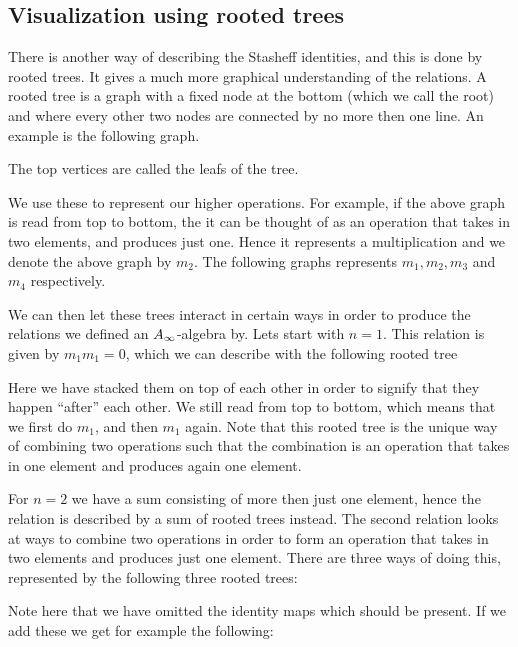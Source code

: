 
\subsection{Visualization using rooted trees}

There is another way of describing the Stasheff identities, and this is done by rooted trees. It gives a much more graphical understanding of the relations. A rooted tree is a graph with a fixed node at the bottom (which we call the root) and where every other two nodes are connected by no more then one line. An example is the following graph.



The top vertices are called the leafs of the tree. 

We use these to represent our higher operations. For example, if the above graph is read from top to bottom, the it can be thought of as an operation that takes in two elements, and produces just one. Hence it represents a multiplication and we denote the above graph by $m_2$. The following graphs represents $m_1, m_2, m_3$ and $m_4$ respectively. 




We can then let these trees interact in certain ways in order to produce the relations we defined an $A_{\infty}$-algebra by. Lets start with $n=1$. This relation is given by $m_1 m_1=0$, which we can describe with the following rooted tree


Here we have stacked them on top of each other in order to signify that they happen ``after'' each other. We still read from top to bottom, which means that we first do $m_1$, and then $m_1$ again. Note that this rooted tree is the unique way of combining two operations such that the combination is an operation that takes in one element and produces again one element. 

For $n=2$ we have a sum consisting of more then just one element, hence the relation is described by a sum of rooted trees instead. The second relation looks at ways to combine two operations in order to form an operation that takes in two elements and produces just one element. There are three ways of doing this, represented by the following three rooted trees:


Note here that we have omitted the identity maps which should be present. If we add these we get for example the following:


